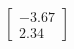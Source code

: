 \documentclass[preview]{standalone}
\begin{document}
\begin{align*}
\begin{bmatrix} -3.67 \\ 2.34 \end{bmatrix}
\end{align*}
\end{document}
